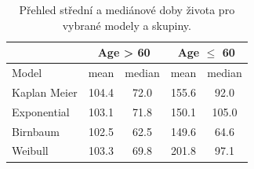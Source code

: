 \documentclass[10pt]{article}
\begin{document}
\begin{table}[htb!]
\centering
\begin{tabular}{lcccc}
 &  \multicolumn{2}{c}{Age > 60} & \multicolumn{2}{c}{Age $\leq$ 60}\\ 
\toprule
Model & mean & median & mean & median \\ 
\midrule
Kaplan Meier & 104.4 & 72.0 & 155.6 & 92.0 \\
Exponential & 103.1 & 71.8 & 150.1 & 105.0 \\
Birnbaum & 102.5 & 62.5 & 149.6 & 64.6\\
Weibull & 103.3 & 69.8 &201.8 & 97.1 \\
\end{tabular}
\caption{Přehled střední a mediánové doby života pro vybrané modely a skupiny.}\label{tab:age}
\end{table}
\end{document}
